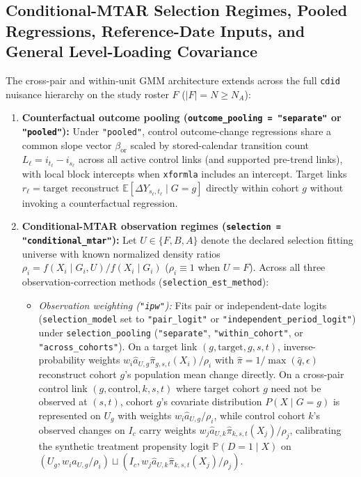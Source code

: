 \documentclass[11pt]{article}
\theoremstyle{definition}
\theoremstyle{remark}
\begin{document}
\subsection{Conditional-MTAR Selection Regimes, Pooled Regressions, Reference-Date Inputs, and General Level-Loading Covariance}

The cross-pair and within-unit GMM architecture extends across the full \texttt{cdid} nuisance hierarchy on the study roster $F$ ($|F| = N \ge N_A$):
\begin{enumerate}
\item \textbf{Counterfactual outcome pooling (\texttt{outcome\_pooling = "separate"} or \texttt{"pooled"}):} Under \texttt{"pooled"}, control outcome-change regressions share a common slope vector $\beta_{\mathrm{or}}$ scaled by stored-calendar transition count $L_\ell = i_{t_\ell} - i_{s_\ell}$ across all active control links (and supported pre-trend links), with local block intercepts when \texttt{xformla} includes an intercept. Target links $r_\ell = \mathrm{target}$ reconstruct $\mathbb{E}[\Delta Y_{s_\ell, t_\ell} \mid G = g]$ directly within cohort $g$ without invoking a counterfactual regression.
\item \textbf{Conditional-MTAR observation regimes (\texttt{selection = "conditional\_mtar"}):} Let $U \in \{F, B, A\}$ denote the declared selection fitting universe with known normalized density ratios $\rho_i = f(X_i \mid G_i, U) / f(X_i \mid G_i)$ ($\rho_i \equiv 1$ when $U = F$). Across all three observation-correction methods (\texttt{selection\_est\_method}):
\begin{itemize}
\item \emph{Observation weighting (\texttt{"ipw"}):} Fits pair or independent-date logits (\texttt{selection\_model} set to \texttt{"pair\_logit"} or \texttt{"independent\_period\_logit"}) under \texttt{selection\_pooling} (\texttt{"separate"}, \texttt{"within\_cohort"}, or \texttt{"across\_cohorts"}). On a target link $(g, \mathrm{target}, g, s, t)$, inverse-probability weights $w_i \hat{a}_{U,g} \hat{\pi}_{g,s,t}(X_i) / \rho_i$ with $\hat{\pi} = 1/\max(\hat{q}, \epsilon)$ reconstruct cohort $g$'s population mean change directly. On a cross-pair control link $(g, \mathrm{control}, k, s, t)$ where target cohort $g$ need not be observed at $(s,t)$, cohort $g$'s covariate distribution $P(X \mid G = g)$ is represented on $U_g$ with weights $w_i \hat{a}_{U,g} / \rho_i$, while control cohort $k$'s observed changes on $I_c$ carry weights $w_j \hat{a}_{U,k} \hat{\pi}_{k,s,t}(X_j) / \rho_j$, calibrating the synthetic treatment propensity logit $\mathbb{P}(D = 1 \mid X)$ on $(U_g, w_i \hat{a}_{U,g}/\rho_i) \sqcup (I_c, w_j \hat{a}_{U,k} \hat{\pi}_{k,s,t}(X_j)/\rho_j)$.

\end{itemize}
\end{enumerate}
\end{document}
